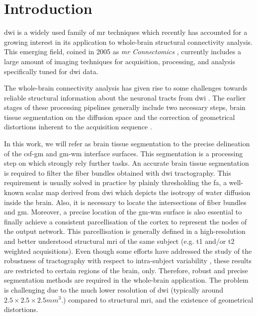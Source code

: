 \section{Introduction}
\label{sec:introduction}
%
\Gls{dwi} is a widely used family of \gls{mr} techniques
\citep{sundgren_diffusion_2004} which recently has accounted for a growing
interest in its application to whole-brain structural connectivity analysis.
This emerging field, coined in 2005 as \emph{\gls{mr} Connectomics}
\citep{hagmann_diffusion_2005,sporns_human_2005}, currently includes a
large amount of imaging techniques for acquisition, processing, and analysis
specifically tuned for \gls{dwi} data.

The whole-brain connectivity analysis has given rise to some challenges
towards reliable structural information about the neuronal tracts 
from \gls{dwi} \cite{johansen-berg_using_2009,jones_white_2012}. 
The earlier stages of these processing pipelines generally include 
two necessary steps, brain tissue segmentation on the diffusion space 
and the correction of geometrical distortions inherent to the acquisition 
sequence \citep{hagmann_mr_2012}.

In this work, we will refer as brain tissue segmentation to the precise
delineation of the \gls{csf}-\gls{gm} and \gls{gm}-\gls{wm} interface surfaces.
This segmentation is a processing step on which strongly rely further
tasks. An accurate brain tissue segmentation is required
to filter the fiber bundles obtained with \gls{dwi} tractography. 
This requirement is usually solved in practice by plainly thresholding the 
\gls{fa}, a well-known scalar map derived from \gls{dwi} which depicts 
the isotropy of water diffusion inside the brain. Also,
it is necessary to locate the intersections of fiber bundles and \gls{gm}.
Moreover, a precise location of the \gls{gm}-\gls{wm} surface is also essential 
to finally achieve a consistent parcellisation of the cortex 
to represent the nodes of the output network. This parcellisation 
is generally defined in a high-resolution and better understood structural 
\gls{mri} of the same 
subject (e.g. \gls{t1} and/or \gls{t2} weighted acquisitions). Even though
some efforts have addressed the study of the robustness of tractography with
respect to intra-subject variability \cite{heiervang_between_2006,
wakana_reproducibility_2007}, these results are restricted to certain regions 
of the brain, only. Therefore, robust and precise segmentation methods are 
required in the whole-brain application. The problem is challenging due to
the much lower resolution of \gls{dwi} (typically around 
$2.5\times2.5\times2.5mm^3.$) compared to structural \gls{mri}, and the
existence of geometrical distortions.

